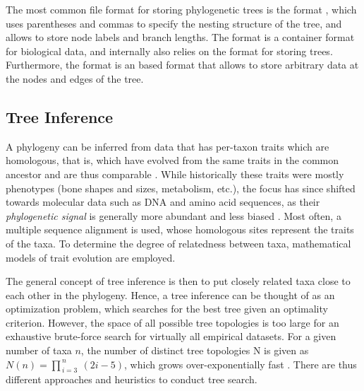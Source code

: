 
The most common file format for storing phylogenetic trees is the  format \cite{Archie1986},
which uses parentheses and commas to specify the nesting structure of the tree,
and allows to store node labels and branch lengths.
The  format \cite{Maddison1997} is a container format for biological data,
and internally also relies on the  format for storing trees.
Furthermore, the  format \cite{Han2009} is an  based format
that allows to store arbitrary data at the nodes and edges of the tree.


\subsection{Tree Inference}
\label{ch:Foundations:sec:TreeOfLife:sub:TreeInference}

A phylogeny can be inferred from data that has per-taxon traits which are homologous,
that is, which have evolved from the same traits in the common ancestor and are thus comparable \cite{Felsenstein2004,Yang2006}.
While historically these traits were mostly phenotypes (bone shapes and sizes, metabolism, etc.),
the focus has since shifted towards molecular data such as DNA and amino acid sequences,
as their \emph{phylogenetic signal} is generally more abundant and less biased \cite{Hillis2000}.
Most often, a multiple sequence alignment is used,
whose homologous sites represent the traits of the taxa.
To determine the degree of relatedness between taxa, mathematical models of trait evolution are employed.

The general concept of tree inference is then to put closely related taxa close to each other in the phylogeny.
Hence, a tree inference can be thought of as an optimization problem,
which searches for the best tree given an optimality criterion.
However, the space of all possible tree topologies is too large for an exhaustive brute-force search
for virtually all empirical datasets.
For a given number of taxa $n$, the number of distinct tree topologies N is given as
$N(n) = \prod_{\,i=3}^{\,n} ~(2i - 5)$,
which grows over-exponentially fast \cite{Felsenstein2004}.
There are thus different approaches and heuristics to conduct tree search.

